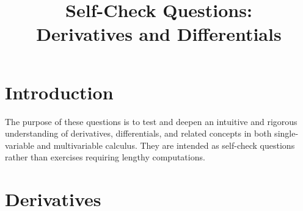 \documentclass{self-check}
\title{Self-Check Questions:\\Derivatives and Differentials}
\author{}
\date{}
\begin{document}
\maketitle
\tableofcontents
\newpage

\section{Introduction}

The purpose of these questions is to test and deepen an intuitive and rigorous understanding of derivatives, differentials, and related concepts in both single-variable and multivariable calculus. They are intended as self-check questions rather than exercises requiring lengthy computations.

\section{Derivatives}
\end{document}
